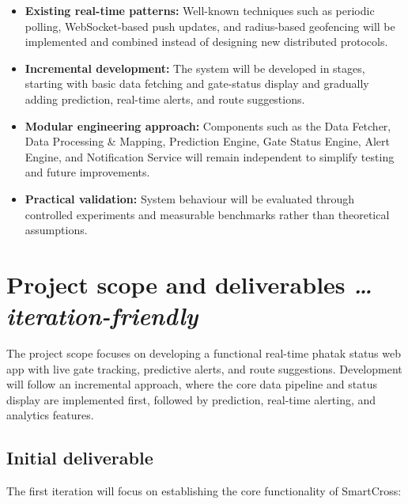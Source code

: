 \documentclass[11pt,a4paper]{article}
\newcommand{\BvrHint}[1]{%
  {\normalfont\normalsize\itshape\hfill #1}}
\begin{document}
\begin{itemize}
    \item \textbf{Existing real-time patterns:} Well-known techniques such as periodic polling, WebSocket-based push updates, and radius-based geofencing will be implemented and combined instead of designing new distributed protocols.

    \item \textbf{Incremental development:} The system will be developed in stages, starting with basic data fetching and gate-status display and gradually adding prediction, real-time alerts, and route suggestions.

    \item \textbf{Modular engineering approach:} Components such as the Data Fetcher, Data Processing \& Mapping, Prediction Engine, Gate Status Engine, Alert Engine, and Notification Service will remain independent to simplify testing and future improvements.

    \item \textbf{Practical validation:} System behaviour will be evaluated through controlled experiments and measurable benchmarks rather than theoretical assumptions.
\end{itemize}

\section{Project scope and deliverables %
\BvrHint{\ldots iteration-friendly}}

The project scope focuses on developing a functional real-time phatak status web app with live gate tracking, predictive alerts, and route suggestions. Development will follow an incremental approach, where the core data pipeline and status display are implemented first, followed by prediction, real-time alerting, and analytics features.


\subsection{Initial deliverable}

The first iteration will focus on establishing the core functionality of SmartCross:
\end{document}
